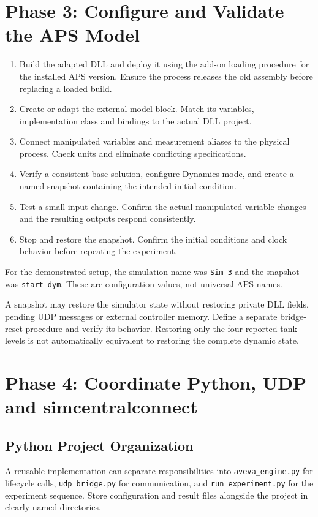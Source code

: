 \documentclass[11pt, letterpaper]{article}
\begin{document}
\section{Phase 3: Configure and Validate the APS Model}
\begin{enumerate}[leftmargin=1.5em,itemsep=0.4em]
\item Build the adapted DLL and deploy it using the add-on loading procedure for the installed APS version. Ensure the process releases the old assembly before replacing a loaded build.
\item Create or adapt the external model block. Match its variables, implementation class and bindings to the actual DLL project.
\item Connect manipulated variables and measurement aliases to the physical process. Check units and eliminate conflicting specifications.
\item Verify a consistent base solution, configure Dynamics mode, and create a named snapshot containing the intended initial condition.
\item Test a small input change. Confirm the actual manipulated variable changes and the resulting outputs respond consistently.
\item Stop and restore the snapshot. Confirm the initial conditions and clock behavior before repeating the experiment.
\end{enumerate}

For the demonstrated setup, the simulation name was \texttt{Sim 3} and the snapshot was \texttt{start dym}. These are configuration values, not universal APS names.

\begin{notebox}
A snapshot may restore the simulator state without restoring private DLL fields, pending UDP messages or external controller memory. Define a separate bridge-reset procedure and verify its behavior. Restoring only the four reported tank levels is not automatically equivalent to restoring the complete dynamic state.
\end{notebox}

\section{Phase 4: Coordinate Python, UDP and simcentralconnect}
\subsection{Python Project Organization}
A reusable implementation can separate responsibilities into \texttt{aveva\_engine.py} for lifecycle calls, \texttt{udp\_bridge.py} for communication, and \texttt{run\_experiment.py} for the experiment sequence. Store configuration and result files alongside the project in clearly named directories.
\end{document}
